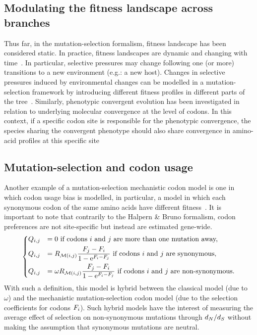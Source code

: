 \subsection{Modulating the fitness landscape across branches}
\label{subsec:modulating-the-fitness-landscape-across-branches}

Thus far, in the mutation-selection formalism, fitness landscape has been considered static.
In practice, fitness landscapes are dynamic and changing with time~\citep{Naumenko2012, Bazykin2015}.
In particular, selective pressures may change following one (or more) transitions to a new environment (e.g.: a new host).
Changes in selective pressures induced by environmental changes can be modelled in a mutation-selection framework by introducing different fitness profiles in different parts of the tree~\citep{Tamuri2009}.
Similarly, phenotypic convergent evolution has been investigated in relation to underlying molecular convergence at the level of codons.
In this context, if a specific codon site is responsible for the phenotypic convergence, the species sharing the convergent phenotype should also share convergence in amino-acid profiles at this specific site~\citep{Parto2018,Parto2018a}

\subsection{Mutation-selection and codon usage}
\label{subsec:model-codon-usage}

Another example of a mutation-selection mechanistic codon model is one in which codon usage bias is modelled, in particular, a model in which each synonymous codon of the same amino acids have different fitness~\citep{Yang2008}.
It is important to note that contrarily to the Halpern \& Bruno formalism, codon preferences are not site-specific but instead are estimated gene-wide.
\begin{equation}
    \begin{dcases}
        Q_{{i}, {j}} & = 0 \text{ if codons ${i}$ and ${j}$ are more than one mutation away,} \\
        Q_{{i}, {j}} & = R_{\mathcal{M}({i}, {j})} \dfrac{F_{{j}} - F_{{i}}}{1 - \text{e}^{F_{{i}} - F_{{j}}} }\text{ if codons ${i}$ and ${j}$ are synonymous,} \\
        Q_{{i}, {j}} & = \omega R_{\mathcal{M}({i}, {j})} \dfrac{F_{{j}} - F_{{i}}}{1 - \text{e}^{F_{{i}} - F_{{j}}} } \text{ if codons ${i}$ and ${j}$ are non-synonymous}.
    \end{dcases}
    \label{eq:yang-codon-models}
\end{equation}
With such a definition, this model is hybrid between the classical model (due to $\omega$) and the mechanistic mutation-selection codon model (due to the selection coefficients for codons $F_{{i}}$).
Such hybrid models have the interest of measuring the average effect of selection on non-synonymous mutations through $d_N / d_S$ without making the assumption that synonymous mutations are neutral.


